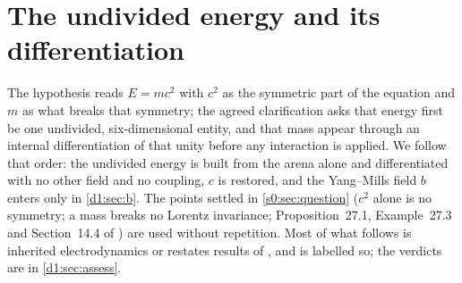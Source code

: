 \section{The undivided energy and its differentiation}
\label{d1:sec:main}

The hypothesis reads $E=mc^2$ \cite{Einstein1905} with $c^2$ as the symmetric part of the equation and $m$ as what breaks that symmetry; the
agreed clarification asks that energy first be one undivided, six-dimensional entity, and that mass appear through an internal differentiation
of that unity before any interaction is applied. We follow that order: the undivided energy is built from the arena alone and differentiated with
no other field and no coupling, $c$ is restored, and the Yang--Mills field $b$ \cite{YangMills54} enters only in \cref{d1:sec:b}. The points settled in
\cref{s0:sec:question} ($c^2$ alone is no symmetry; a mass breaks no Lorentz invariance; Proposition~27.1, Example~27.3 and Section~14.4 of
\cite{ES17}) are used without repetition. Most of what follows is
inherited electrodynamics or restates results of \cite{ES17}, and is labelled so; the verdicts are in \cref{d1:sec:assess}.

